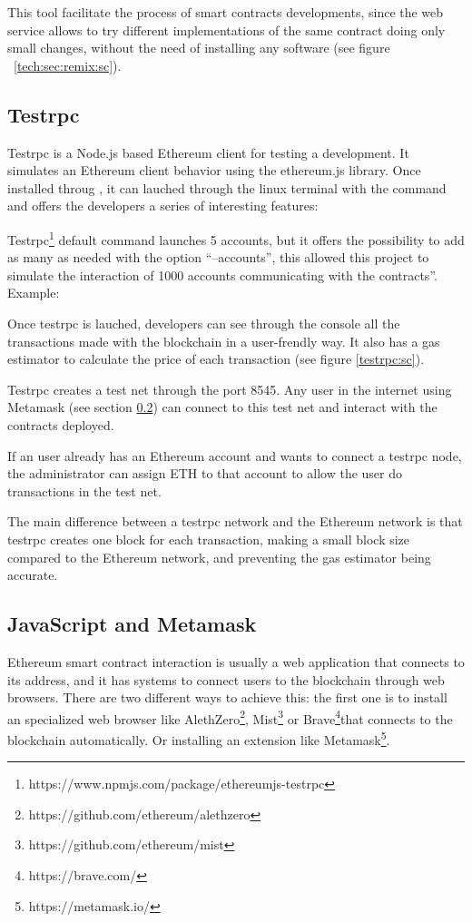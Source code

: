 This tool facilitate the process of smart contracts developments, since the web
service allows to try different implementations of the same contract doing only
small changes, without the need of installing any software (see figure
~\ref{tech:sec:remix:sc}).

\subsection{Testrpc}
\label{testrpc}
 Testrpc is a Node.js based Ethereum client for
testing a development. It simulates an Ethereum client behavior using the
ethereum.js library. Once installed throug , it can lauched through
the linux terminal with the command  and offers the developers a
series of interesting features:

\begin{itemize}
  Testrpc\footnote{https://www.npmjs.com/package/ethereumjs-testrpc} default
  command launches 5 accounts, but it offers the possibility to add as many as
  needed with the option ``--accounts'', this allowed this project to simulate
  the interaction of 1000 accounts communicating with the contracts''. Example:

   Once testrpc is lauched, developers can see through
  the console all the transactions made with the blockchain in a user-frendly
  way. It also has a gas estimator to calculate the price of each transaction
  (see figure \ref{testrpc:sc}).

   Testrpc creates a test net through the port 8545. Any
  user in the internet using Metamask (see section \ref{jsmm}) can connect to
  this test net and interact with the contracts deployed.

   If an user already has an Ethereum
  account and wants to connect a testrpc node, the administrator can assign ETH
  to that account to allow the user do transactions in the test net.
\end{itemize}

The main difference between a testrpc network and the Ethereum network is that
testrpc creates one block for each transaction, making a small block size
compared to the Ethereum network, and preventing the gas estimator being
accurate.

\subsection{JavaScript and Metamask}
\label{jsmm}
Ethereum smart contract interaction is usually a web application that connects
to its address, and it has systems to connect users to the blockchain through
web browsers. There are two different ways to achieve this: the first one is to
install an specialized web browser like
AlethZero\footnote{https://github.com/ethereum/alethzero},
Mist\footnote{https://github.com/ethereum/mist} or
Brave\footnote{https://brave.com/}that connects to the blockchain automatically.
Or installing an extension like Metamask\footnote{https://metamask.io/}.


